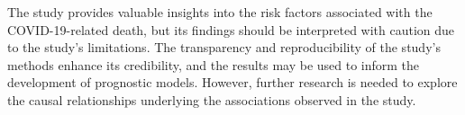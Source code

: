 \documentclass{article}
\begin{document}
The study provides valuable insights into the risk factors associated with the COVID-19-related death, 
but its findings should be interpreted with caution due to the study's limitations. 
The transparency and reproducibility of the study's methods enhance its credibility, and the results may be used to inform the development of prognostic models. 
However, further research is needed to explore the causal relationships underlying the associations observed in the study.


\end{document}
